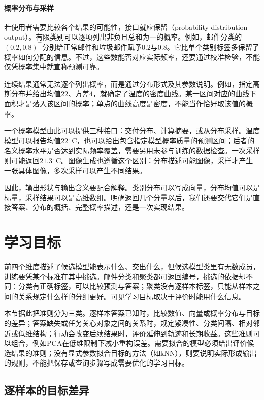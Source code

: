 \paragraph{概率分布与采样}
\label{sec:models-distribution-output}

若使用者需要比较各个结果的可能性，接口就应保留（probability distribution output）。有限类别可以逐项列出非负且总和为一的概率。例如，邮件分类的$(0.2,0.8)^{\top}$分别给正常邮件和垃圾邮件赋予$0.2$与$0.8$。它比单个类别标签多保留了概率如何分配的信息。不过，这些数能否对应实际频率，还要通过校准检验，不能仅凭概率集中就宣称预测可靠。

连续结果通常无法逐个列出概率，而是通过分布形式及其参数说明。例如，指定高斯分布并给出均值$22$、方差$4$，就确定了温度的密度曲线。某一区间对应的曲线下面积才是落入该区间的概率；单点的曲线高度是密度，不能当作恰好取该值的概率。

一个概率模型由此可以提供三种接口：交付分布、计算摘要，或从分布采样。温度模型可以报告均值$22\,^{\circ}\mathrm{C}$，也可以给出包含指定模型概率质量的预测区间；后者的名义概率水平是否达到实际频率覆盖，需要另用未参与训练的数据检查。一次采样则可能返回$21.3\,^{\circ}\mathrm{C}$。图像生成也遵循这个区别：分布描述可能图像，采样才产生一张具体图像，多次采样可以产生不同结果。

因此，输出形状与输出含义要配合解释。类别分布可以写成向量，分布均值可以是标量，采样结果可以是高维数组。明确返回几个分量以后，我们还要交代它们是直接答案、分布的概括、完整概率描述，还是一次实现结果。

\section{学习目标}
\label{sec:models-objectives}

前四个维度描述了候选模型能表示什么、交出什么，但候选模型类里有无数成员，训练要凭某个标准在其中挑选。邮件分类和聚类都可返回编号，挑选的依据却不同：分类有正确标签，可以比较预测与答案；聚类没有逐样本标签，只能从样本之间的关系规定什么样的分组更好。可见学习目标取决于评价时能用什么信息。

本节据此把准则分为三类。逐样本答案已知时，比较数值、向量或概率分布与目标的差异；答案缺失或任务关心对象之间的关系时，规定紧凑性、分类间隔、相对邻近或低维结构；行动会改变后续结果时，评价延伸到轨迹和长期收益。这些准则可以组合，例如PCA在低维限制下减小重构误差。需要拟合的模型必须给出评价候选结果的准则；没有显式参数拟合目标的方法（如kNN），则要说明实际形成输出的规则，不能把保存或查询步骤写成需要优化的学习目标。

\subsection{逐样本的目标差异}
\label{sec:models-pointwise-objectives}

